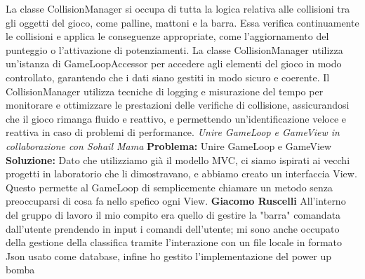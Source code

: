 \documentclass[a4paper,12pt]{report}
\begin{document}
La classe CollisionManager si occupa di tutta la logica relativa alle collisioni tra gli oggetti del gioco, come palline, mattoni e la barra. Essa verifica continuamente le collisioni e applica le conseguenze appropriate, come l'aggiornamento del punteggio o l'attivazione di potenziamenti. La classe CollisionManager utilizza un'istanza di GameLoopAccessor per accedere agli elementi del gioco in modo controllato, garantendo che i dati siano gestiti in modo sicuro e coerente.
Il CollisionManager utilizza tecniche di logging e misurazione del tempo per monitorare e ottimizzare le prestazioni delle verifiche di collisione, assicurandosi che il gioco rimanga fluido e reattivo, e permettendo un'identificazione veloce e reattiva in caso di problemi di performance.
\newline
\newline
\textit{Unire GameLoop e GameView in collaborazione con Sohail Mama}
\newline
\newline
\textbf{Problema: }Unire GameLoop e GameView \newline
\textbf{Soluzione:} Dato che utilizziamo già il modello MVC, ci siamo ispirati ai vecchi progetti in laboratorio che li dimostravano, e abbiamo creato un interfaccia View. Questo permette al GameLoop di semplicemente chiamare un metodo senza preoccuparsi di cosa fa nello spefico ogni View.
\newline
\newline
\textbf{Giacomo Ruscelli}
\newline
\newline
All'interno del gruppo di lavoro il mio compito era quello di gestire la "barra" comandata dall'utente prendendo in input i comandi dell'utente; mi sono anche occupato della gestione della classifica tramite l'interazione con un file locale in formato Json usato come database, infine ho gestito l'implementazione del power up bomba
\end{document}

